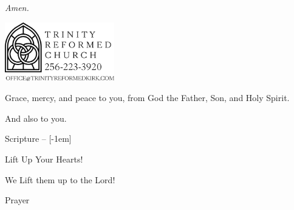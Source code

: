 	\vspace{0.9in}

	\begin{justify}
		\normalsize
		\thecollect  \textit{\phantom{r}Amen.}
	\end{justify}
	\vfill
	\begin{center}
		\includegraphics[height=1in]{../templates/logo2020_email.pdf}
	\end{center}

	\newpage


	\begin{leftbar}
		\vspace{-0.8em}
		\begin{description}[topsep=-1pt,parsep=0pt]\raggedright
			\item[Leader:] Grace, mercy, and peace to you, from God the Father, Son, and Holy Spirit.
			\item[People:] And also to you.
		\end{description}
	\end{leftbar}

	\vspace{-1em}

  Scripture -- \scriptureCalltoWorship {}[-1em]\\

	\begin{leftbar}
		\vspace{-0.8em}
		\begin{description}[topsep=-1pt,parsep=0pt]\raggedright
			\item[Leader:] Lift Up Your Hearts!
			\item[People:] We Lift them up to the Lord!
		\end{description}
	\end{leftbar}

	\vspace{-1em}

	Prayer

	\hymnone

